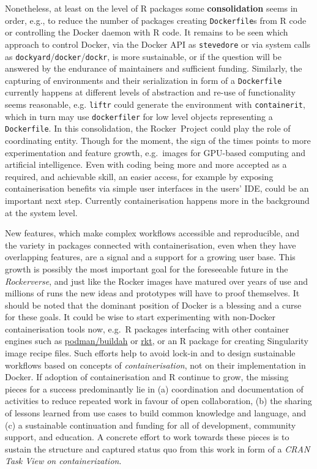 Nonetheless, at least on the level of R packages some
\textbf{consolidation} seems in order, e.g., to reduce the number of
packages creating \texttt{Dockerfile}s from R code or controlling the
Docker daemon with R code. It remains to be seen which approach to
control Docker, via the Docker API as \texttt{stevedore} or via system
calls as \texttt{dockyard}/\texttt{docker}/\texttt{dockr}, is more
sustainable, or if the question will be answered by the endurance of
maintainers and sufficient funding. Similarly, the capturing of
environments and their serialization in form of a \texttt{Dockerfile}
currently happens at different levels of abstraction and re-use of
functionality seems reasonable, e.g. \texttt{liftr} could generate the
environment with \texttt{containerit}, which in turn may use
\texttt{dockerfiler} for low level objects representing a
\texttt{Dockerfile}. In this consolidation, the Rocker~Project could
play the role of coordinating entity. Though for the moment, the sign of
the times points to more experimentation and feature growth, e.g.~images
for GPU-based computing and artificial intelligence. Even with coding
being more and more accepted as a required, and achievable skill, an
easier access, for example by exposing containerisation benefits via
simple user interfaces in the users' IDE, could be an important next
step. Currently containerisation happens more in the background at the
system level.

New features, which make complex workflows accessible and reproducible,
and the variety in packages connected with containerisation, even when
they have overlapping features, are a signal and a support for a growing
user base. This growth is possibly the most important goal for the
foreseeable future in the \emph{Rockerverse}, and just like the Rocker
images have matured over years of use and millions of runs the new ideas
and prototypes will have to proof themselves. It should be noted that
the dominant position of Docker is a blessing and a curse for these
goals. It could be wise to start experimenting with non-Docker
containerisation tools now, e.g.~R packages interfacing with other
container engines such as
\href{https://github.com/containers/libpod}{podman/buildah} or
\href{https://coreos.com/rkt/}{rkt}, or an R package for creating
Singularity image recipe files. Such efforts help to avoid lock-in and
to design sustainable workflows based on concepts of
\emph{containerisation}, not on their implementation in Docker. If
adoption of containerisation and R continue to grow, the missing pieces
for a success predominantly lie in (a) coordination and documentation of
activities to reduce repeated work in favour of open collaboration, (b)
the sharing of lessons learned from use cases to build common knowledge
and language, and (c) a sustainable continuation and funding for all of
development, community support, and education. A concrete effort to work
towards these pieces is to sustain the structure and captured status quo
from this work in form of a \emph{CRAN Task View on containerization}.

